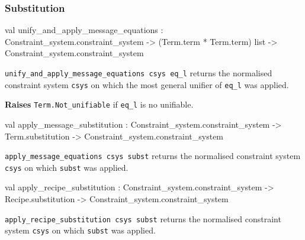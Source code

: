 \begin{ocamldocsigend}
\subsubsection{Substitution}


\label{val:Constraint-underscoresystem.Phase-underscore1.unify-underscoreand-underscoreapply-underscoremessage-underscoreequations}\begin{ocamldoccode}
val unify_and_apply_message_equations :
  Constraint_system.constraint_system ->
  (Term.term * Term.term) list -> Constraint_system.constraint_system
\end{ocamldoccode}
\begin{ocamldocdescription}
{\tt{unify\_and\_apply\_message\_equations csys eq\_l}} returns the normalised constraint system {\tt{csys}} on which 
      the most general unifier of {\tt{eq\_l}} was applied.

{\bf Raises} {\tt{Term.Not\_unifiable}} if {\tt{eq\_l}} is no unifiable.


\end{ocamldocdescription}


\label{val:Constraint-underscoresystem.Phase-underscore1.apply-underscoremessage-underscoresubstitution}\begin{ocamldoccode}
val apply_message_substitution :
  Constraint_system.constraint_system ->
  Term.substitution -> Constraint_system.constraint_system
\end{ocamldoccode}
\begin{ocamldocdescription}
{\tt{apply\_message\_equations csys subst}} returns the normalised constraint system {\tt{csys}} on which 
      {\tt{subst}} was applied.


\end{ocamldocdescription}


\label{val:Constraint-underscoresystem.Phase-underscore1.apply-underscorerecipe-underscoresubstitution}\begin{ocamldoccode}
val apply_recipe_substitution :
  Constraint_system.constraint_system ->
  Recipe.substitution -> Constraint_system.constraint_system
\end{ocamldoccode}
\begin{ocamldocdescription}
{\tt{apply\_recipe\_substitution csys subst}} returns the normalised constraint system {\tt{csys}} on which 
      {\tt{subst}} was applied.


\end{ocamldocdescription}
\end{ocamldocsigend}

